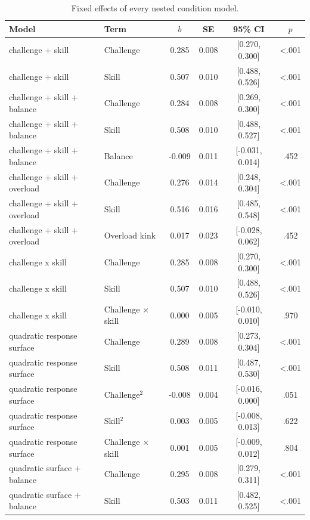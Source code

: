\begin{table}[!htbp]
\raggedright
\caption{Fixed effects of every nested condition model.}
\label{tab:sup-condmodels}
\footnotesize
\begingroup
\setlength{\tabcolsep}{4pt}
\renewcommand{\arraystretch}{1.08}
\noindent
\begin{tabular*}{\textwidth}{@{\extracolsep{\fill}}llcccc@{}}
\toprule
Model & Term & $b$ & SE & 95\% CI & $p$ \\
\midrule
challenge + skill & Challenge & 0.285 & 0.008 & [0.270, 0.300] & <.001 \\
challenge + skill & Skill & 0.507 & 0.010 & [0.488, 0.526] & <.001 \\
challenge + skill + balance & Challenge & 0.284 & 0.008 & [0.269, 0.300] & <.001 \\
challenge + skill + balance & Skill & 0.508 & 0.010 & [0.488, 0.527] & <.001 \\
challenge + skill + balance & Balance & -0.009 & 0.011 & [-0.031, 0.014] & .452 \\
challenge + skill + overload & Challenge & 0.276 & 0.014 & [0.248, 0.304] & <.001 \\
challenge + skill + overload & Skill & 0.516 & 0.016 & [0.485, 0.548] & <.001 \\
challenge + skill + overload & Overload kink & 0.017 & 0.023 & [-0.028, 0.062] & .452 \\
challenge x skill & Challenge & 0.285 & 0.008 & [0.270, 0.300] & <.001 \\
challenge x skill & Skill & 0.507 & 0.010 & [0.488, 0.526] & <.001 \\
challenge x skill & Challenge $\times$ skill & 0.000 & 0.005 & [-0.010, 0.010] & .970 \\
quadratic response surface & Challenge & 0.289 & 0.008 & [0.273, 0.304] & <.001 \\
quadratic response surface & Skill & 0.508 & 0.011 & [0.487, 0.530] & <.001 \\
quadratic response surface & Challenge$^2$ & -0.008 & 0.004 & [-0.016, 0.000] & .051 \\
quadratic response surface & Skill$^2$ & 0.003 & 0.005 & [-0.008, 0.013] & .622 \\
quadratic response surface & Challenge $\times$ skill & 0.001 & 0.005 & [-0.009, 0.012] & .804 \\
quadratic surface + balance & Challenge & 0.295 & 0.008 & [0.279, 0.311] & <.001 \\
quadratic surface + balance & Skill & 0.503 & 0.011 & [0.482, 0.525] & <.001 \\

\end{tabular*}
\end{table}
